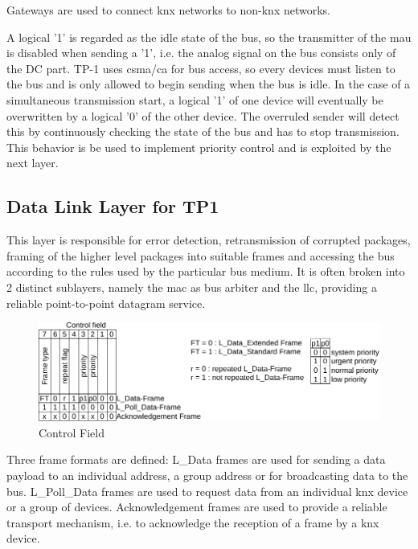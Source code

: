 Gateways are used to connect \gls{knx} networks to non-\gls{knx} networks.

A logical '1' is regarded as the idle state of the bus, so the transmitter of the \gls{mau} is disabled when sending a '1', i.e. the analog signal on
the bus consists only of the DC part. \gls{TP}-1 uses \gls{csma}/\gls{ca} for bus access, so every devices must listen to the bus and is only allowed
to begin sending when the bus is idle. In the case of a simultaneous transmission start, a logical '1' of one
device will eventually be overwritten by a logical '0' of the other device. The overruled
sender will detect this by continuously checking the state of the bus and has to stop 
transmission. This behavior is be used to implement priority control and is exploited by the next layer.

\subsection{Data Link Layer for TP1}

This layer is responsible for error detection, retransmission of corrupted 
packages, framing of the higher level packages into suitable frames and accessing the bus according to the rules used by the particular bus medium. 
It is often broken into 2 distinct sublayers, namely the \gls{mac} as bus arbiter and the \gls{llc}, providing a reliable point-to-point datagram service.

\begin{figure}
    \centering
    \includegraphics[width=1\textwidth]{figures/ctrl}
    \caption{Control Field}
    \label{fig:ctrlfield}
\end{figure}

Three frame formats are defined: L\_Data frames are used for sending a data payload to an individual address, a group address or for broadcasting data to
the bus. L\_Poll\_Data frames are used to request data from an individual knx device or a group of devices. Acknowledgement frames are used to provide a reliable
transport mechanism, i.e. to acknowledge the reception of a frame by a knx device. 


